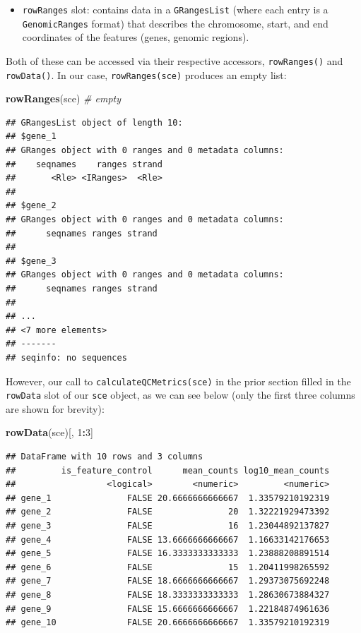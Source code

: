 \documentclass[]{book}
\newenvironment{Shaded}{\begin{snugshade}}{\end{snugshade}}
\newcommand{\CommentTok}[1]{\textcolor[rgb]{0.56,0.35,0.01}{\textit{#1}}}
\newcommand{\DecValTok}[1]{\textcolor[rgb]{0.00,0.00,0.81}{#1}}
\newcommand{\KeywordTok}[1]{\textcolor[rgb]{0.13,0.29,0.53}{\textbf{#1}}}
\newcommand{\NormalTok}[1]{#1}
\newcommand{\OperatorTok}[1]{\textcolor[rgb]{0.81,0.36,0.00}{\textbf{#1}}}
\providecommand{\tightlist}{%
  \setlength{\itemsep}{0pt}\setlength{\parskip}{0pt}}
\begin{document}
\begin{itemize}
\tightlist
\item
  \texttt{rowRanges} slot: contains data in a \texttt{GRangesList} (where each entry is a \texttt{GenomicRanges} format) that describes the chromosome, start, and end coordinates of the features (genes, genomic regions).
\end{itemize}

Both of these can be accessed via their respective accessors, \texttt{rowRanges()} and \texttt{rowData()}. In our case, \texttt{rowRanges(sce)} produces an empty list:

\begin{Shaded}
\begin{Highlighting}[]
\KeywordTok{rowRanges}\NormalTok{(sce) }\CommentTok{# empty}
\end{Highlighting}
\end{Shaded}

\begin{verbatim}
## GRangesList object of length 10:
## $gene_1 
## GRanges object with 0 ranges and 0 metadata columns:
##    seqnames    ranges strand
##       <Rle> <IRanges>  <Rle>
## 
## $gene_2 
## GRanges object with 0 ranges and 0 metadata columns:
##      seqnames ranges strand
## 
## $gene_3 
## GRanges object with 0 ranges and 0 metadata columns:
##      seqnames ranges strand
## 
## ...
## <7 more elements>
## -------
## seqinfo: no sequences
\end{verbatim}

However, our call to \texttt{calculateQCMetrics(sce)} in the prior section filled in the \texttt{rowData} slot of our \texttt{sce} object, as we can see below (only the first three columns are shown for brevity):

\begin{Shaded}
\begin{Highlighting}[]
\KeywordTok{rowData}\NormalTok{(sce)[, }\DecValTok{1}\OperatorTok{:}\DecValTok{3}\NormalTok{]}
\end{Highlighting}
\end{Shaded}

\begin{verbatim}
## DataFrame with 10 rows and 3 columns
##         is_feature_control      mean_counts log10_mean_counts
##                  <logical>        <numeric>         <numeric>
## gene_1               FALSE 20.6666666666667  1.33579210192319
## gene_2               FALSE               20  1.32221929473392
## gene_3               FALSE               16  1.23044892137827
## gene_4               FALSE 13.6666666666667  1.16633142176653
## gene_5               FALSE 16.3333333333333  1.23888208891514
## gene_6               FALSE               15  1.20411998265592
## gene_7               FALSE 18.6666666666667  1.29373075692248
## gene_8               FALSE 18.3333333333333  1.28630673884327
## gene_9               FALSE 15.6666666666667  1.22184874961636
## gene_10              FALSE 20.6666666666667  1.33579210192319
\end{verbatim}
\end{document}
